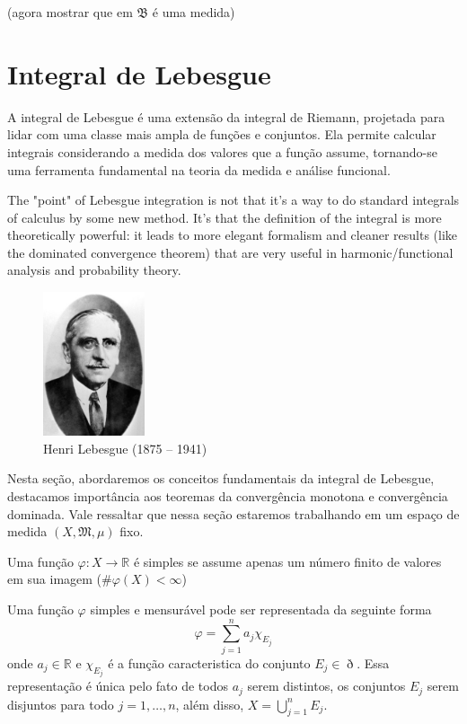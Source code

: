 \documentclass[a4paper, 11pt]{book}
\theoremstyle{definition}
\newcommand{\bR}{\mathbb{R}}
\newcommand{\cB}{\mathfrak{B}}
\begin{document}
(agora mostrar que em $\cB$ é uma medida)

\section{Integral de Lebesgue}

A integral de Lebesgue é uma extensão da integral de Riemann, projetada para lidar com uma classe mais ampla de funções e conjuntos. Ela permite calcular integrais considerando a medida dos valores que a função assume, tornando-se uma ferramenta fundamental na teoria da medida e análise funcional.

The "point" of Lebesgue integration is not that it's a way to do standard integrals of calculus by some new method. It's that the definition of the integral is more theoretically powerful: it leads to more elegant formalism and cleaner results (like the dominated convergence theorem) that are very useful in harmonic/functional analysis and probability theory. 

\begin{figure}
    \centering
    \includegraphics[width=3cm]{lebesgue.jpeg}
    \caption{Henri Lebesgue (1875 -- 1941)}
\end{figure}

Nesta seção, abordaremos os conceitos fundamentais da integral de Lebesgue, destacamos importância aos teoremas da convergência monotona e convergência dominada.
Vale ressaltar que nessa seção estaremos trabalhando em um espaço de medida $(X, \mathfrak{M}, \mu)$ fixo.

\begin{dbox}
    Uma função $\varphi : X \to \bR$ é simples se assume apenas um número finito de valores em sua imagem ($\# \varphi(X) < \infty$)
\end{dbox}

Uma função $\varphi$ simples e mensurável pode ser representada da seguinte forma
\begin{equation} \label{eq:representacaopadrao}
    \varphi = \sum_{j = 1}^n a_j \chi_{E_j}
\end{equation}
onde $a_j \in \bR$ e $\chi_{E_j}$ é a função caracteristica do conjunto $E_j \in \eth$. Essa representação é única pelo fato de todos $a_j$ serem distintos, os conjuntos $E_j$ serem disjuntos para todo $j = 1,\dots,n$, além disso, $X = \bigcup_{j=1}^n E_j$.    
\end{document}
